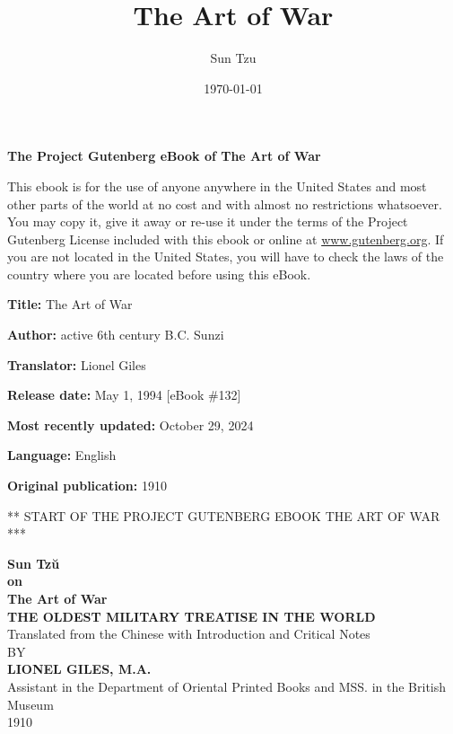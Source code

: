 \documentclass[12pt,a4paper]{book}
\title{The Art of War}
\author{Sun Tzu}
\date{\today}
\begin{document}
\maketitle
\thispagestyle{empty}

\begin{center}
{\small \textbf{The Project Gutenberg eBook of The Art of War}}
\end{center}


\noindent
This ebook is for the use of anyone anywhere in the United States and most other parts of the world at no cost and with almost no restrictions whatsoever. You may copy it, give it away or re-use it under the terms of the Project Gutenberg License included with this ebook or online at \url{www.gutenberg.org}. If you are not located in the United States, you will have to check the laws of the country where you are located before using this eBook.

\vspace{1em}

\textbf{Title:} The Art of War

\textbf{Author:} active 6th century B.C. Sunzi

\textbf{Translator:} Lionel Giles

\textbf{Release date:} May 1, 1994 [eBook \#132]

\textbf{Most recently updated:} October 29, 2024

\textbf{Language:} English

\textbf{Original publication:} 1910

\vspace{2em}

\begin{center}
{\footnotesize *** START OF THE PROJECT GUTENBERG EBOOK THE ART OF WAR ***}
\end{center}


\newpage

\thispagestyle{empty}
\begin{center}
{\Huge \textbf{Sun Tzŭ}} \\[2em]
{\Huge \textbf{on}} \\[2em]
{\Huge \textbf{The Art of War}} \\[2em]
\textbf{THE OLDEST MILITARY TREATISE IN THE WORLD} \\[1em]
Translated from the Chinese with Introduction and Critical Notes \\[1em]
BY \\[3em]
\textbf{LIONEL GILES, M.A.} \\[1em]
Assistant in the Department of Oriental Printed Books and MSS. in the British Museum \\[0.5em]
1910
\end{center}
\end{document}
